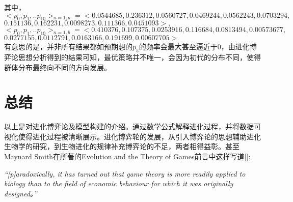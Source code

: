 \documentclass[12pt]{article}
\begin{document}
\noindent 其中，$<p_0,p_1,..p_{10}>_{n=1,a}=<0.0544685, 0.236312, 0.0560727, 0.0469244, 0.0562243, 0.0703294,$\\$ 0.151136, 0.162231, 0.0098273, 0.111366, 0.0451093>, $\\$<p_0,p_1,..p_{10}>_{n=1,b}=<0.410376, 0.107375, 0.0253916, 0.116684, 0.0813494, 0.00573677, $\\$0.0277155, 0.0112791, 0.0163166, 0.191699, 0.00607705>$\\

\noindent 有意思的是，并非所有结果都如预期想的$p_5$的频率会最大甚至逼近于0，由进化博弈论思想分析得到的结果可知，最优策略并不唯一，会因为初代的分布不同，使得群体分布最终向不同的方向发展。


\section{总结}
以上是对进化博弈论及模型构建的介绍。通过数学公式解释进化过程，并将数据可视化使得进化过程被清晰展示。进化博弈轮的发展，从引入博弈论的思想辅助进化生物学的研究，到生物进化的规律补充博弈论的不足，两者相得益彰。甚至Maynard Smith在所著的Evolution and the Theory of Games前言中这样写道[\cite{smith1982evolution}]:\\
\par
\emph{
	“[p]aradoxically, it has turned out that game theory is more readily applied to biology than to the field of economic behaviour for which it was originally designed。” 
}

\newpage



\end{document}
